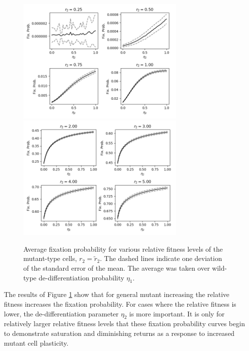 \documentclass[12pt]{article}
\begin{document}
\begin{figure}[H]
\begin{center}
\includegraphics[width=0.74\textwidth]{avg_eta1_r2_stackplot1.png}\\
\includegraphics[width=0.74\textwidth]{avg_eta1_r2_stackplot2.png}
\end{center}
\caption{Average fixation probability for various relative fitness levels of the mutant-type cells, $r_2=\tilde{r}_2$. The dashed lines indicate one deviation of the standard error of the mean. The average was taken over wild-type de-differentiation probability $\eta_1$.}\label{r2_stack}
\end{figure}

The results of Figure \ref{r2_stack} show that for general mutant increasing the relative fitness increases the fixation probability. For cases where the relative fitness is lower, the de-differentiation parameter $\eta_2$ is more important. It is only for relatively larger relative fitness levels that  these fixation probability curves begin to demonstrate saturation and diminishing returns as a response to increased mutant cell plasticity. 
\end{document}
